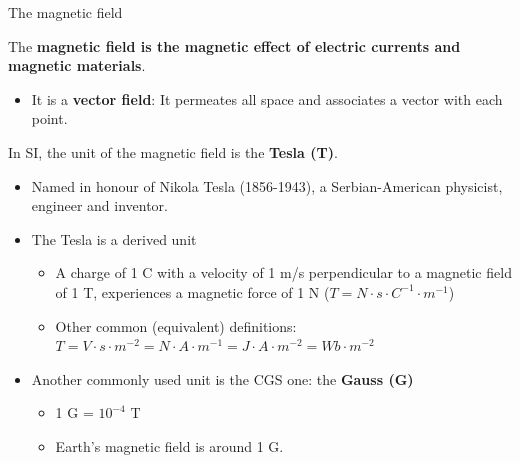 \begin{frame}{The magnetic field}

The {\bf magnetic field is the magnetic effect of electric currents and magnetic materials}.
\begin{itemize}
   \item It is a {\bf vector field}: It permeates all space and associates a vector with each point.
\end{itemize}

\vspace{0.2cm}

In SI, the unit of the magnetic field is the {\bf Tesla (T)}.
\begin{itemize}
  \item Named in honour of Nikola Tesla (1856-1943), a
            Serbian-American physicist, engineer and inventor.
   \item The Tesla is a derived unit
       \begin{itemize}
            \item A charge of 1 C with a velocity of 1 m/s perpendicular to a
                     magnetic field of 1 T, experiences a magnetic force of 1 N ($T = N \cdot s \cdot C^{-1} \cdot m^{-1}$)\\
            \item Other common (equivalent) definitions:
                      $T = V \cdot s \cdot m^{-2} = N \cdot A \cdot m^{-1} = J \cdot A \cdot m^{-2} = Wb \cdot m^{-2}$
       \end{itemize}
   \item Another commonly used unit is the CGS one: the {\bf Gauss (G)}
       \begin{itemize}
             \item 1 G = $10^{-4}$ T
             \item Earth's magnetic field is around 1 G.
       \end{itemize}
\end{itemize}

\end{frame}

%
%
%

